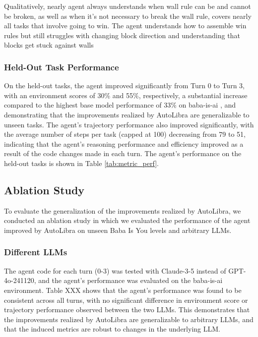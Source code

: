 Qualitatively, nearly agent always understands when wall rule can be and cannot be broken, as well as when it's not necessary to break the wall rule, covers nearly all tasks that involve going to win. The agent understands how to assemble win rules but still struggles with changing block direction and understanding that blocks get stuck against walls

\subsubsection{Held-Out Task Performance}

On the held-out tasks, the agent improved significantly from Turn 0 to Turn 3, with an environment scores of 30\% and 55\%, respectively, a substantial increase compared to the highest base model performance of 33\% on baba-is-ai \cite{paglieri2024balrog}, and demonstrating that the improvements realized by AutoLibra are generalizable to unseen tasks. The agent's trajectory performance also improved significantly, with the average number of steps per task (capped at 100) decreasing from 79 to 51, indicating that the agent's reasoning performance and efficiency improved as a result of the code changes made in each turn. The agent's performance on the held-out tasks is shown in Table \ref{tab:metric_perf}.


\subsection{Ablation Study}

To evaluate the generalization of the improvements realized by AutoLibra, we conducted an ablation study in which we evaluated the performance of the agent improved by AutoLibra on unseen Baba Is You levels and arbitrary LLMs.

\subsubsection{Different LLMs}

The agent code for each turn (0-3) was tested with Claude-3-5 instead of GPT-4o-241120, and the agent's performance was evaluated on the baba-is-ai environment. Table XXX shows that the agent's performance was found to be consistent across all turns, with no significant difference in environment score or trajectory performance observed between the two LLMs. This demonstrates that the improvements realized by AutoLibra are generalizable to arbitrary LLMs, and that the induced metrics are robust to changes in the underlying LLM.

